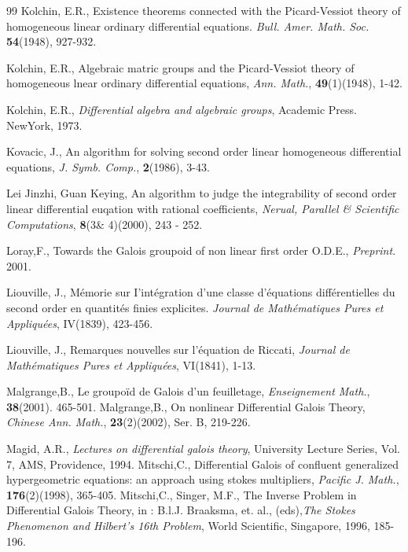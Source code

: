 \documentclass[preprint, 12pt]{elsarticle}
\numberwithin{equation}{section}
\begin{document}
\begin{thebibliography}{99}
 Kolchin, E.R., Existence theorems connected with the Picard-Vessiot
theory of homogeneous linear
ordinary differential equations. \textit{Bull. Amer. Math. Soc.}
\textbf{54}(1948), 927-932.

 Kolchin, E.R., Algebraic matric groups and the
Picard-Vessiot theory of homogeneous lnear ordinary differential
equations, \textit{Ann. Math.}, \textbf{49}(1)(1948), 1-42.

 Kolchin, E.R., \textit{Differential algebra and algebraic groups},
 Academic Press. NewYork, 1973.

 Kovacic, J., An algorithm for solving second
order linear homogeneous differential equations, \textit{J. Symb.
Comp.}, \textbf{2}(1986), 3-43.

 Lei Jinzhi, Guan Keying, An algorithm to judge the
integrability of second order linear differential euqation with
rational coefficients, \textit{Nerual, Parallel \& Scientific
Computations}, \textbf{8}(3\& 4)(2000), 243 - 252.

 Loray,F., Towards the Galois groupoid of non linear first order O.D.E.,
\textit{Preprint}. 2001.

 Liouville, J., M\'{e}morie sur I'int\'{e}gration d'une classe d'\'{e}quations diff\'{e}rentielles du second order en quantit\'{e}s finies explicites.  \textit{Journal de Math\'{e}matiques Pures et Appliqu\'{e}es}, IV(1839), 423-456.

 Liouville, J., Remarques nouvelles sur l'\'{e}quation
de Riccati, \textit{Journal de Math\'{e}matiques Pures et
Appliqu\'{e}es}, VI(1841), 1-13.

 Malgrange,B., Le groupo\"{i}d de Galois d'un feuilletage,
\textit{Enseignement Math.}, \textbf{38}(2001). 465-501.
 Malgrange,B., On nonlinear Differential Galois
Theory, \textit{Chinese Ann. Math.}, \textbf{23}(2)(2002), Ser. B,
219-226.

 Magid, A.R., \textit{Lectures on differential galois theory},
University Lecture Series, Vol. 7, AMS, Providence, 1994.
 Mitschi,C., Differential Galois of confluent
generalized hypergeometric equations: an approach using stokes
multipliers, \textit{Pacific J. Math.}, \textbf{176}(2)(1998),
365-405.
 Mitschi,C., Singer, M.F., The Inverse Problem in Differential Galois Theory,
in : B.l.J. Braaksma, et. al., (eds),\textit{The Stokes Phenomenon
and Hilbert's 16th Problem},  World Scientific, Singapore, 1996,
185-196.


\end{thebibliography}
\end{document}
